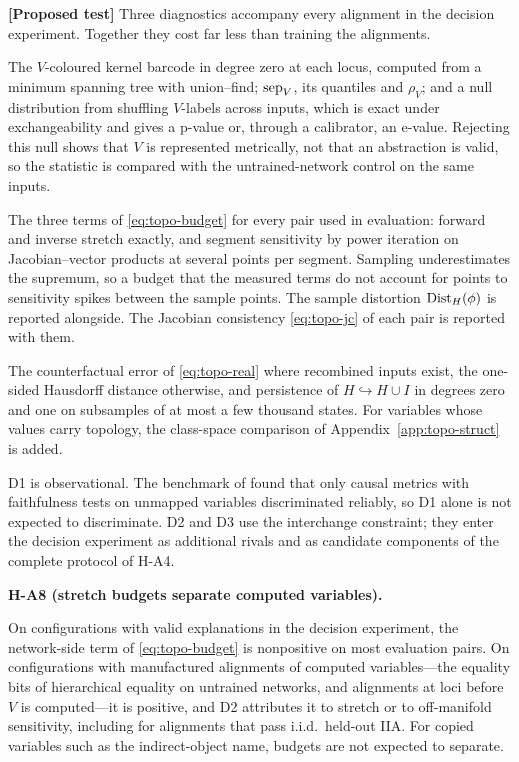 \documentclass[11pt,a4paper]{article}
\newcommand{\evl}[2]{{\small\bfseries\color{#1}[#2]}}
\newcommand{\LTest}{\evl{ctest}{Proposed test}}
\newenvironment{hypbox}[1]{%
  \def\FrameCommand{{\color{chyp}\vrule width 1.6pt}\hspace{8pt}}%
  \MakeFramed{\advance\hsize-\width\FrameRestore}%
  \noindent\textbf{#1}\par\smallskip\noindent\ignorespaces}{\endMakeFramed}
\begin{document}
\LTest{} Three diagnostics accompany every alignment in the decision
experiment. Together they cost far less than training the alignments.
\begin{description}[style=nextline,leftmargin=1.5em]
\item[D1, network side.] The $V$-coloured kernel barcode in degree zero at each
locus, computed from a minimum spanning tree with union--find; $\operatorname{sep}_V$, its
quantiles and $\rho_V$; and a null distribution from shuffling $V$-labels
across inputs, which is exact under exchangeability and gives a p-value or,
through a calibrator, an e-value. Rejecting this null shows that $V$ is
represented metrically, not that an abstraction is valid, so the statistic is
compared with the untrained-network control on the same inputs.
\item[D2, map side.] The three terms of \eqref{eq:topo-budget} for every pair
used in evaluation: forward and inverse stretch exactly, and segment
sensitivity by power iteration on Jacobian--vector products at several points
per segment. Sampling underestimates the supremum, so a budget that the
measured terms do not account for points to sensitivity spikes between the
sample points. The sample distortion $\operatorname{Dist}_H(\phi)$ is reported alongside.
The Jacobian consistency \eqref{eq:topo-jc} of each pair is reported with
them.
\item[D3, realizability.] The counterfactual error of \eqref{eq:topo-real}
where recombined inputs exist, the one-sided Hausdorff distance otherwise,
and persistence of $H\hookrightarrow H\cup I$ in degrees zero and one on
subsamples of at most a few thousand states. For variables whose values carry
topology, the class-space comparison of Appendix~\ref{app:topo-struct} is
added.
\end{description}
D1 is observational. The benchmark of \cite{meloux2026} found that only causal
metrics with faithfulness tests on unmapped variables discriminated reliably,
so D1 alone is not expected to discriminate. D2 and D3 use the interchange
constraint; they enter the decision experiment as additional rivals and as
candidate components of the complete protocol of H-A4.

\begin{hypbox}{H-A8 (stretch budgets separate computed variables).}
On configurations with valid explanations in the decision experiment, the
network-side term of \eqref{eq:topo-budget} is nonpositive on most evaluation
pairs. On configurations with manufactured alignments of computed variables---the
equality bits of hierarchical equality on untrained networks, and alignments
at loci before $V$ is computed---it is positive, and D2 attributes it to
stretch or to off-manifold sensitivity, including for alignments that pass
i.i.d.\ held-out IIA. For copied variables such as the indirect-object name,
budgets are not expected to separate.
\end{hypbox}
\end{document}
